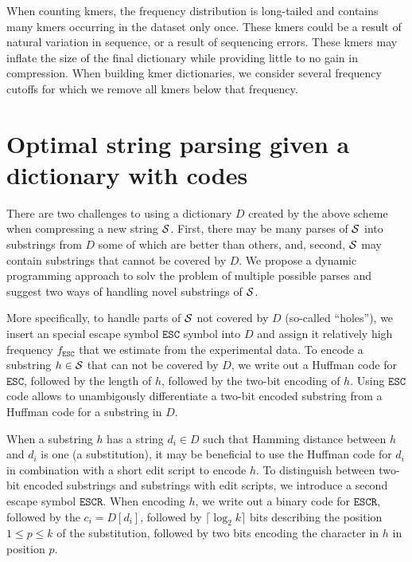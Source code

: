 \documentclass[12pt]{cmuthesis}
\begin{document}
  When counting kmers, the frequency distribution is long-tailed and contains many kmers occurring in the dataset only once. These kmers could be a result of natural variation in sequence, or a result of sequencing errors.  These kmers may inflate the size of the final dictionary while providing little to no gain in compression. When building kmer dictionaries, we consider several frequency cutoffs for which we remove all kmers below that frequency.




\section{Optimal string parsing given a dictionary with codes}

  \newcommand{\esc}{\texttt{ESC}\xspace}
  \newcommand{\escremap}{\texttt{ESCR}\xspace}


  There are two challenges to using a dictionary $D$ created by the above scheme when compressing a new string $\mathcal{S}$. First, there may be many parses of $\mathcal{S}$ into substrings from $D$ some of which are better than others, and, second, $\mathcal{S}$ may contain substrings that cannot be covered by $D$. We propose a dynamic programming approach to solv the problem of multiple possible parses and suggest two ways of handling novel substrings of $\mathcal{S}$.

  More specifically, to handle parts of $\mathcal{S}$ not covered by $D$ (so-called ``holes''), we insert an special escape symbol $\esc$ symbol into $D$ and assign it relatively high frequency $f_{\esc}$ that we estimate from the experimental data. To encode a substring $h \in \mathcal{S}$ that can not be covered by $D$, we write out a Huffman code for $\esc$, followed by the length of $h$, followed by the two-bit encoding of $h$. Using $\esc$ code allows to unambigously differentiate a two-bit encoded substring from a Huffman code for a substring in $D$.

  When a substring $h$ has a string $d_i \in D$ such that Hamming distance between $h$ and $d_i$ is one (a substitution), it may be beneficial to use the Huffman code for $d_i$ in combination with a short edit script to encode $h$. To distinguish between two-bit encoded substrings and substrings with edit scripts, we introduce a second escape symbol $\escremap$. When encoding $h$, we write out a binary code for $\escremap$, followed by the $c_i = D[d_i]$, followed by $\lceil \log_2 k \rceil$ bits describing the position $1 \leq p \leq k$ of the substitution, followed by two bits encoding the character in $h$ in position $p$.
\end{document}
